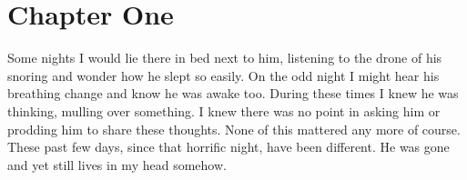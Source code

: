 \chapter{Chapter One}

Some nights I would lie there in bed next to him, listening to the drone of his
snoring and wonder how he slept so easily. On the odd night I might hear his
breathing change and know he was awake too. During these times I knew he was
thinking, mulling over something. I knew there was no point in asking him or
prodding him to share these thoughts. None of this mattered any more of course.
These past few days, since that horrific night, have been different. He was gone
and yet still lives in my head somehow. 

